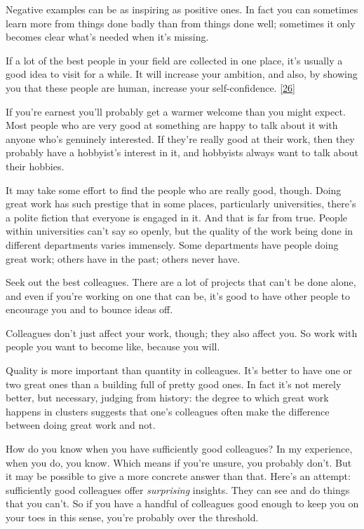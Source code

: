 Negative examples can be as inspiring as positive ones. In fact you can
sometimes learn more from things done badly than from things done well;
sometimes it only becomes clear what's needed when it's missing.

If a lot of the best people in your field are collected in one place,
it's usually a good idea to visit for a while. It will increase your
ambition, and also, by showing you that these people are human, increase
your self-confidence. {[}\hyperref[f26n]{26}{]}

If you're earnest you'll probably get a warmer welcome than you might
expect. Most people who are very good at something are happy to talk
about it with anyone who's genuinely interested. If they're really good
at their work, then they probably have a hobbyist's interest in it, and
hobbyists always want to talk about their hobbies.

It may take some effort to find the people who are really good, though.
Doing great work has such prestige that in some places, particularly
universities, there's a polite fiction that everyone is engaged in it.
And that is far from true. People within universities can't say so
openly, but the quality of the work being done in different departments
varies immensely. Some departments have people doing great work; others
have in the past; others never have.

Seek out the best colleagues. There are a lot of projects that can't be
done alone, and even if you're working on one that can be, it's good to
have other people to encourage you and to bounce ideas off.

Colleagues don't just affect your work, though; they also affect you. So
work with people you want to become like, because you will.

Quality is more important than quantity in colleagues. It's better to
have one or two great ones than a building full of pretty good ones. In
fact it's not merely better, but necessary, judging from history: the
degree to which great work happens in clusters suggests that one's
colleagues often make the difference between doing great work and not.

How do you know when you have sufficiently good colleagues? In my
experience, when you do, you know. Which means if you're unsure, you
probably don't. But it may be possible to give a more concrete answer
than that. Here's an attempt: sufficiently good colleagues offer
\emph{surprising} insights. They can see and do things that you can't.
So if you have a handful of colleagues good enough to keep you on your
toes in this sense, you're probably over the threshold.

